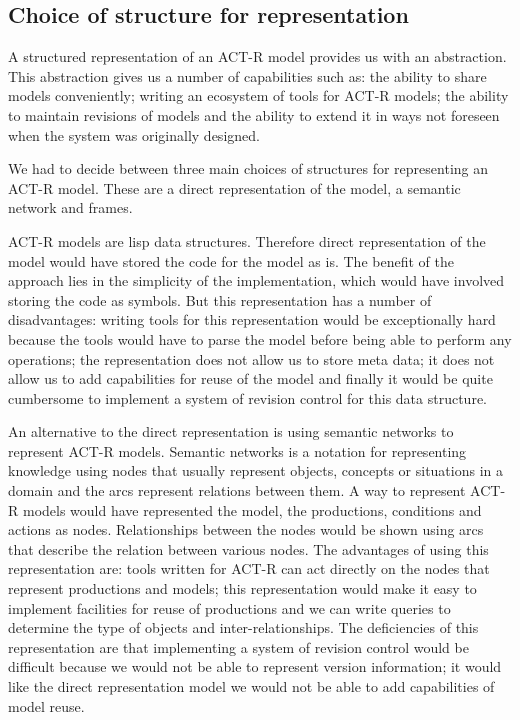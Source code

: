 \subsection{Choice of structure for representation}
A structured representation of an ACT-R model provides us with an
abstraction. This abstraction gives us a number of capabilities such
as: the ability to share models conveniently; writing an ecosystem of
tools for ACT-R models; the ability to maintain revisions of
models and the ability to extend it in ways not foreseen when the
system was originally designed.

We had to decide between three main choices of structures for
representing an ACT-R model. These are a direct representation of the
model, a semantic network and frames. 

ACT-R models are lisp data structures. Therefore direct representation
of the model would have stored the code for the model as is. The
benefit of the approach lies in the simplicity of the implementation,
which would have involved storing the code as symbols. But this
representation has a number of disadvantages: writing tools for this
representation would be exceptionally hard because the tools would
have to parse the model before being able to perform any operations;
the representation does not allow us to store meta data; it does not
allow us to add capabilities for reuse of the model and finally it
would be quite cumbersome to implement a system of revision control
for this data structure.

An alternative to the direct representation is using semantic networks
to represent ACT-R models. Semantic networks is a notation for
representing knowledge using nodes that usually represent objects,
concepts or situations in a domain and the arcs represent relations
between them\cite{Sowa87, Barr81}. A way to represent ACT-R models
would have represented the model, the productions, conditions and
actions as nodes. Relationships between the nodes would be shown using
arcs that describe the relation between various nodes. The advantages
of using this representation are: tools written for ACT-R can act
directly on the nodes that represent productions and models; this
representation would make it easy to implement facilities for reuse of
productions and we can write queries to determine the type of objects
and inter-relationships. The deficiencies of this representation are
that implementing a system of revision control would be difficult
because we would not be able to represent version information; it
would like the direct representation model we would not be able to add
capabilities of model reuse.


